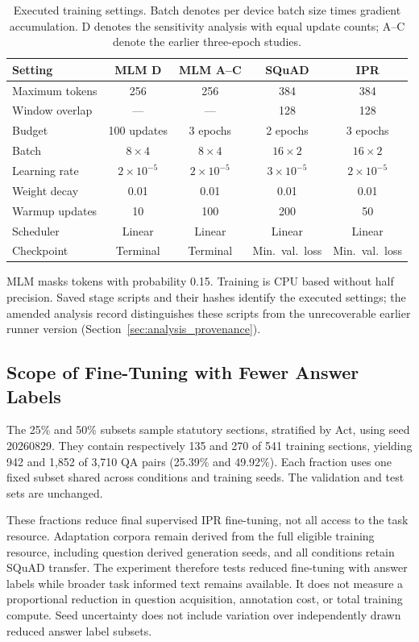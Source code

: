 \documentclass[pdflatex,sn-basic]{sn-jnl}
\begin{document}
\begin{table}[!htbp]
\caption{Executed training settings. Batch denotes per device batch size
times gradient accumulation. D denotes the sensitivity analysis with equal update counts; A--C
denote the earlier three-epoch studies.}
\label{tab:training_recipe}
\centering\small
\begin{tabular}{@{}lcccc@{}}
\toprule
Setting & MLM D & MLM A--C & SQuAD & IPR \\
\midrule
Maximum tokens & 256 & 256 & 384 & 384 \\
Window overlap & --- & --- & 128 & 128 \\
Budget & 100 updates & 3 epochs & 2 epochs & 3 epochs \\
Batch & \(8\times4\) & \(8\times4\) & \(16\times2\) & \(16\times2\) \\
Learning rate & \(2\times10^{-5}\) & \(2\times10^{-5}\) & \(3\times10^{-5}\) & \(2\times10^{-5}\) \\
Weight decay & 0.01 & 0.01 & 0.01 & 0.01 \\
Warmup updates & 10 & 100 & 200 & 50 \\
Scheduler & Linear & Linear & Linear & Linear \\
Checkpoint & Terminal & Terminal & Min.\ val.\ loss & Min.\ val.\ loss \\
\bottomrule
\end{tabular}
\end{table}

MLM masks tokens with probability 0.15. Training is CPU based without
half precision. Saved stage scripts and their hashes identify the executed
settings; the amended analysis record distinguishes these scripts from the
unrecoverable earlier runner version
(Section~\ref{sec:analysis_provenance}).

\subsection{Scope of Fine-Tuning with Fewer Answer Labels}\label{sec:reduced_design}

The 25\% and 50\% subsets sample statutory sections, stratified by Act, using
seed 20260829. They contain respectively 135 and 270 of 541 training sections,
yielding 942 and 1,852 of 3,710 QA pairs (25.39\% and 49.92\%).
Each fraction uses one fixed subset shared across conditions and training
seeds. The validation and test sets are unchanged.

These fractions reduce final supervised IPR fine-tuning, not all access to
the task resource. Adaptation corpora remain derived from the full eligible
training resource, including question derived generation seeds, and all
conditions retain SQuAD transfer. The experiment therefore tests reduced
fine-tuning with answer labels while broader task informed text remains available. It does
not measure a proportional reduction in question acquisition, annotation
cost, or total training compute. Seed uncertainty does not include variation
over independently drawn reduced answer label subsets.
\end{document}
